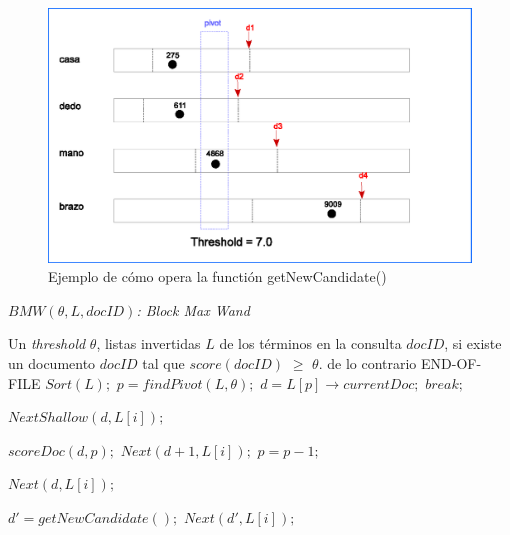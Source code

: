 \begin{figure}[!th]
\centering
\includegraphics[scale=.75]{images/get_new_candidate.eps}
\caption{Ejemplo de cómo opera la functión getNewCandidate()}
\label{fig:getNewCandidate}
\end{figure}%

\begin{algorithm}[!th]
\caption{\em $BMW(\theta, L, docID)$: Block Max Wand}
\label{alg:bmw}
\begin{algorithmic}[1]
\REQUIRE Un \textit{threshold} $\theta$, listas invertidas $L$ de los términos en la consulta
\ENSURE $docID$, si existe un documento $docID$ tal que $score(docID)$ $\geq$ $\theta$. de lo contrario END-OF-FILE
	\STATE $Sort(L);$
	\STATE $p = findPivot(L,\theta);$
	\STATE $d = L[p] \rightarrow currentDoc;$
  		\STATE $break;$
	\ENDIF
		
		\STATE $NextShallow(d, L[i]);$
	\ENDFOR
	
			\STATE $scoreDoc(d, p);$
				\STATE $Next(d + 1, L[i]);$
			\ENDFOR
		\ELSE
				\STATE $p = p - 1;$			
			\ENDWHILE
			
				\STATE $Next(d, L[i]);$
			\ENDFOR
			
		\ENDIF		
	\ELSE	
		\STATE $d' = getNewCandidate();$
			\STATE $Next(d', L[i]);$
		\ENDFOR
	\ENDIF
	
\ENDWHILE

\end{algorithmic}
\end{algorithm}